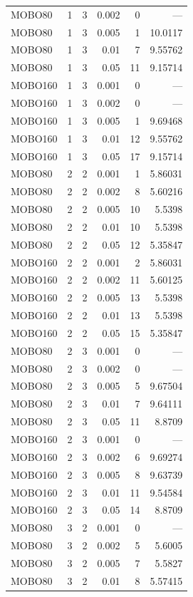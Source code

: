 \begin{tabular}{lrrrrr}
MOBO80 & 1 & 3 & 0.002 & 0 & — \\
MOBO80 & 1 & 3 & 0.005 & 1 & 10.0117 \\
MOBO80 & 1 & 3 & 0.01 & 7 & 9.55762 \\
MOBO80 & 1 & 3 & 0.05 & 11 & 9.15714 \\
MOBO160 & 1 & 3 & 0.001 & 0 & — \\
MOBO160 & 1 & 3 & 0.002 & 0 & — \\
MOBO160 & 1 & 3 & 0.005 & 1 & 9.69468 \\
MOBO160 & 1 & 3 & 0.01 & 12 & 9.55762 \\
MOBO160 & 1 & 3 & 0.05 & 17 & 9.15714 \\
MOBO80 & 2 & 2 & 0.001 & 1 & 5.86031 \\
MOBO80 & 2 & 2 & 0.002 & 8 & 5.60216 \\
MOBO80 & 2 & 2 & 0.005 & 10 & 5.5398 \\
MOBO80 & 2 & 2 & 0.01 & 10 & 5.5398 \\
MOBO80 & 2 & 2 & 0.05 & 12 & 5.35847 \\
MOBO160 & 2 & 2 & 0.001 & 2 & 5.86031 \\
MOBO160 & 2 & 2 & 0.002 & 11 & 5.60125 \\
MOBO160 & 2 & 2 & 0.005 & 13 & 5.5398 \\
MOBO160 & 2 & 2 & 0.01 & 13 & 5.5398 \\
MOBO160 & 2 & 2 & 0.05 & 15 & 5.35847 \\
MOBO80 & 2 & 3 & 0.001 & 0 & — \\
MOBO80 & 2 & 3 & 0.002 & 0 & — \\
MOBO80 & 2 & 3 & 0.005 & 5 & 9.67504 \\
MOBO80 & 2 & 3 & 0.01 & 7 & 9.64111 \\
MOBO80 & 2 & 3 & 0.05 & 11 & 8.8709 \\
MOBO160 & 2 & 3 & 0.001 & 0 & — \\
MOBO160 & 2 & 3 & 0.002 & 6 & 9.69274 \\
MOBO160 & 2 & 3 & 0.005 & 8 & 9.63739 \\
MOBO160 & 2 & 3 & 0.01 & 11 & 9.54584 \\
MOBO160 & 2 & 3 & 0.05 & 14 & 8.8709 \\
MOBO80 & 3 & 2 & 0.001 & 0 & — \\
MOBO80 & 3 & 2 & 0.002 & 5 & 5.6005 \\
MOBO80 & 3 & 2 & 0.005 & 7 & 5.5827 \\
MOBO80 & 3 & 2 & 0.01 & 8 & 5.57415 \\

\end{tabular}
